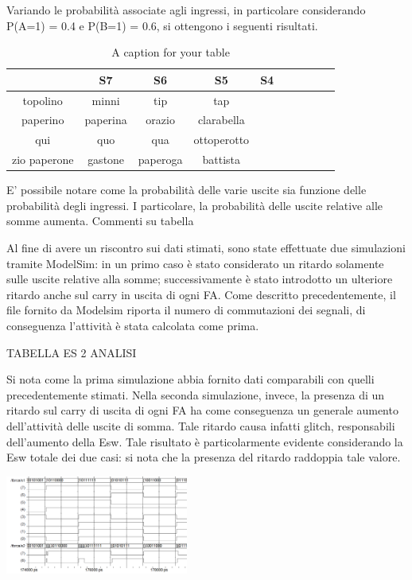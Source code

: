 Variando le probabilità associate agli ingressi, in particolare considerando P(A=1) = 0.4 e P(B=1) = 0.6, si ottengono i seguenti risultati.

\begin{table}
\begin{center}
\begin{tabular}{|c|c|c|c|c|c|c|c|c|c|}
\hline
 & S7 & S6 & S5 & S4 \\
\hline
topolino & minni & tip & tap \\
\hline
\hline
paperino & paperina & orazio & clarabella \\
\hline
qui & quo & qua & ottoperotto \\
zio paperone & gastone & paperoga & battista \\ 
\hline 
\end{tabular}
\end{center}
\caption{A caption for your table}
\label{A-lable-for-your-table}
\end{table}

E' possibile notare come la probabilità delle varie uscite sia funzione delle probabilità degli ingressi.
I particolare, la probabilità delle uscite relative alle somme aumenta. Commenti su tabella

Al fine di avere un riscontro sui dati stimati, sono state effettuate due simulazioni tramite ModelSim: in un primo caso è stato considerato un ritardo solamente sulle uscite relative alla somme; successivamente è stato introdotto un ulteriore ritardo anche sul carry in uscita di ogni FA.
Come descritto precedentemente, il file fornito da Modelsim riporta il numero di commutazioni dei segnali, di conseguenza l'attività è stata calcolata come prima.

TABELLA ES 2 ANALISI

Si nota come la prima simulazione abbia fornito dati comparabili con quelli precedentemente stimati. Nella seconda simulazione, invece, la presenza di un ritardo sul carry di uscita di ogni FA ha come conseguenza un generale aumento dell'attività delle uscite di somma. Tale ritardo causa infatti glitch, responsabili dell'aumento della Esw.
Tale risultato è particolarmente evidente considerando la Esw totale dei due casi: si nota che la presenza del ritardo raddoppia tale valore.

\includegraphics[width=6cm]{./img/Lab_1/Es_2/Glitch.png} 

